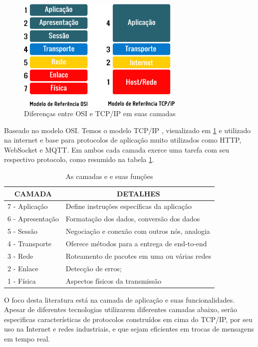 \begin{figure}[h!]
\centering
\includegraphics[width=8cm]{./02_Capitulos/02_Cap1/figures/modelo_osi_tcpip}
\caption{Diferenças entre OSI e TCP/IP em suas camadas}
\label{fig:1.2.0/modelo_osi_tcpip}
\end{figure}

Baseado no modelo OSI. Temos o modelo TCP/IP \cite{TCPIP}, visualizado em \ref{fig:1.2.0/modelo_osi_tcpip} e utilizado na internet e base para protocolos de aplicação muito utilizados como HTTP, WebSocket e MQTT. Em ambos cada camada exerce uma tarefa com seu respectivo protocolo, como resumido na tabela \ref{table:1.2.0}.

\begin{table}[h]
\centering
\caption{As camadas e e suas funções}
\begin{tabular}{|l|l|}
\hline
\multicolumn{1}{|c|}{CAMADA} & \multicolumn{1}{c|}{DETALHES}                                                  \\ \hline
7 - Aplicação                & Define instruções específicas da aplicação          						    \\ \hline
6 - Apresentação             & Formatação dos dados, conversão dos dados                     					\\ \hline
5 - Sessão                   & Negociação e conexão com outros nós, analogia                                \\ \hline
4 - Transporte               & Oferece métodos para a entrega de end-to-end                        			\\ \hline
3 - Rede                     & Roteamento de pacotes em uma ou várias redes                                 \\ \hline
2 - Enlace                   & Detecção de erros;                                                            \\ \hline
1 - Física                   & Aspectos físicos da transmissão \\ \hline
\end{tabular}
\label{table:1.2.0}
\end{table}


O foco desta literatura está na camada de aplicação e suas funcionalidades. Apesar de diferentes tecnologias utilizarem diferentes camadas abaixo, serão especificas características de protocolos construídos em cima do TCP/IP, por seu uso na Internet e redes industriais, e que sejam eficientes em trocas de mensagens em tempo real.

